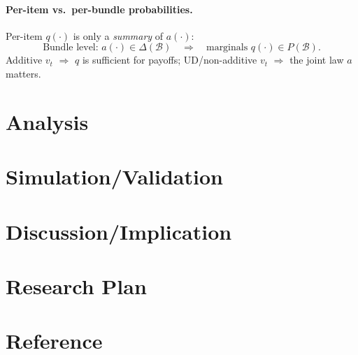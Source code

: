 \documentclass[dvipdfmx,autodetect-engine]{article}
\newcommand{\B}{\mathcal{B}}
\begin{document}
\paragraph{Per-item vs.\ per-bundle probabilities.}
Per-item $q(\cdot)$ is only a \emph{summary} of $a(\cdot)$:
\[
\text{Bundle level: } a(\cdot)\in \Delta(\B)\quad\Longrightarrow\quad
\text{marginals } q(\cdot)\in P(\B).
\]
Additive $v_t$ $\Rightarrow$ $q$ is sufficient for payoffs; UD/non-additive $v_t$ $\Rightarrow$ the joint law $a$ matters.
\section*{Analysis}


\section*{Simulation/Validation}


\section*{Discussion/Implication}

\section*{Research Plan}

\section*{Reference}


\nocite{*}
\printbibliography
\end{document}
